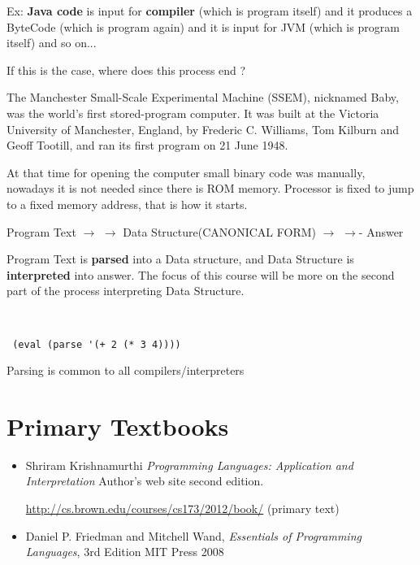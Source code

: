 \documentclass{article}
\begin{document}
\begin{flushleft}
\noindent
Ex: \textbf{Java code} is input for \textbf{compiler} (which is program itself) and it produces a ByteCode (which is program again) and it is input for JVM (which is program itself) and so on...

\noindent
If this is the case, where does this process end ? 

\noindent
The Manchester Small-Scale Experimental Machine (SSEM), nicknamed Baby, was the world's first stored-program computer. It was built at the Victoria University of Manchester, England, by Frederic C. Williams, Tom Kilburn and Geoff Tootill, and ran its first program on 21 June 1948.

\noindent
At that time for opening the computer small binary code was manually, nowadays it is not needed since there is ROM memory. Processor is fixed to jump to a fixed memory address, that is how it starts. 
                
Program Text  $\rightarrow$ $\rightarrow$ Data Structure(CANONICAL FORM)  $\rightarrow$ $\rightarrow$- Answer 

Program Text is \textbf{parsed} into a Data structure, and Data Structure is \textbf{interpreted} into answer. The focus of this course will be more on the second part of the process interpreting Data Structure.


\\
\begin{verbatim}
 (eval (parse '(+ 2 (* 3 4))))
\end{verbatim}
Parsing is common to all compilers/interpreters


\end{flushleft}


\section*{Primary Textbooks}
\begin{itemize}


\item Shriram Krishnamurthi \emph{Programming Languages: Application and Interpretation} Author's web site  second edition. 

\url{http://cs.brown.edu/courses/cs173/2012/book/} (primary text)

\item Daniel P. Friedman and Mitchell Wand, \emph{Essentials of Programming Languages}, 3rd Edition MIT Press 2008
\end{itemize}
\end{document}
